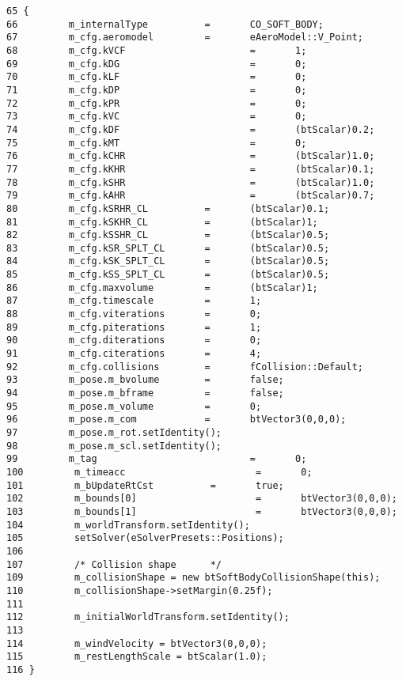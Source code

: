 \begin{Code}\begin{verbatim}65 {
66         m_internalType          =       CO_SOFT_BODY;
67         m_cfg.aeromodel         =       eAeroModel::V_Point;
68         m_cfg.kVCF                      =       1;
69         m_cfg.kDG                       =       0;
70         m_cfg.kLF                       =       0;
71         m_cfg.kDP                       =       0;
72         m_cfg.kPR                       =       0;
73         m_cfg.kVC                       =       0;
74         m_cfg.kDF                       =       (btScalar)0.2;
75         m_cfg.kMT                       =       0;
76         m_cfg.kCHR                      =       (btScalar)1.0;
77         m_cfg.kKHR                      =       (btScalar)0.1;
78         m_cfg.kSHR                      =       (btScalar)1.0;
79         m_cfg.kAHR                      =       (btScalar)0.7;
80         m_cfg.kSRHR_CL          =       (btScalar)0.1;
81         m_cfg.kSKHR_CL          =       (btScalar)1;
82         m_cfg.kSSHR_CL          =       (btScalar)0.5;
83         m_cfg.kSR_SPLT_CL       =       (btScalar)0.5;
84         m_cfg.kSK_SPLT_CL       =       (btScalar)0.5;
85         m_cfg.kSS_SPLT_CL       =       (btScalar)0.5;
86         m_cfg.maxvolume         =       (btScalar)1;
87         m_cfg.timescale         =       1;
88         m_cfg.viterations       =       0;
89         m_cfg.piterations       =       1;      
90         m_cfg.diterations       =       0;
91         m_cfg.citerations       =       4;
92         m_cfg.collisions        =       fCollision::Default;
93         m_pose.m_bvolume        =       false;
94         m_pose.m_bframe         =       false;
95         m_pose.m_volume         =       0;
96         m_pose.m_com            =       btVector3(0,0,0);
97         m_pose.m_rot.setIdentity();
98         m_pose.m_scl.setIdentity();
99         m_tag                           =       0;
100         m_timeacc                       =       0;
101         m_bUpdateRtCst          =       true;
102         m_bounds[0]                     =       btVector3(0,0,0);
103         m_bounds[1]                     =       btVector3(0,0,0);
104         m_worldTransform.setIdentity();
105         setSolver(eSolverPresets::Positions);
106         
107         /* Collision shape      */ 
109         m_collisionShape = new btSoftBodyCollisionShape(this);
110         m_collisionShape->setMargin(0.25f);
111         
112         m_initialWorldTransform.setIdentity();
113 
114         m_windVelocity = btVector3(0,0,0);
115         m_restLengthScale = btScalar(1.0);
116 }
\end{verbatim}
\end{Code}




